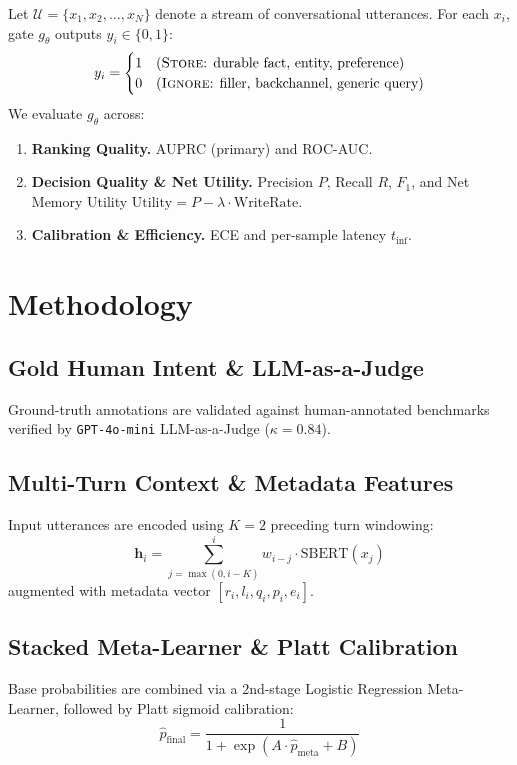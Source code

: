 \documentclass[journal]{IEEEtran}
\begin{document}
Let $\mathcal{U} = \{x_1, x_2, \ldots, x_N\}$ denote a stream of conversational utterances. For each $x_i$, gate $g_\theta$ outputs $y_i \in \{0,1\}$:
\begin{equation}
  y_i = \begin{cases} 1 & \text{(\textsc{Store}: durable fact, entity, preference)} \\ 0 & \text{(\textsc{Ignore}: filler, backchannel, generic query)} \end{cases}
\end{equation}
We evaluate $g_\theta$ across:
\begin{enumerate}
  \item \textbf{Ranking Quality.} AUPRC (primary) and ROC-AUC.
  \item \textbf{Decision Quality \& Net Utility.} Precision $P$, Recall $R$, $F_1$, and Net Memory Utility $\text{Utility} = P - \lambda \cdot \text{WriteRate}$.
  \item \textbf{Calibration \& Efficiency.} ECE and per-sample latency $t_{\inf}$.
\end{enumerate}

\section{Methodology}

\subsection{Gold Human Intent \& LLM-as-a-Judge}
Ground-truth annotations are validated against human-annotated benchmarks verified by \texttt{GPT-4o-mini} LLM-as-a-Judge ($\kappa{=}0.84$).

\subsection{Multi-Turn Context \& Metadata Features}
Input utterances are encoded using $K{=}2$ preceding turn windowing:
\begin{equation}
  \mathbf{h}_i = \sum_{j=\max(0, i-K)}^{i} w_{i-j} \cdot \mathrm{SBERT}(x_j)
\end{equation}
augmented with metadata vector $[r_i, l_i, q_i, p_i, e_i]$.

\subsection{Stacked Meta-Learner \& Platt Calibration}
Base probabilities are combined via a 2nd-stage Logistic Regression Meta-Learner, followed by Platt sigmoid calibration:
\begin{equation}
  \hat{p}_{\mathrm{final}} = \frac{1}{1 + \exp(A \cdot \hat{p}_{\mathrm{meta}} + B)}
\end{equation}
\end{document}
